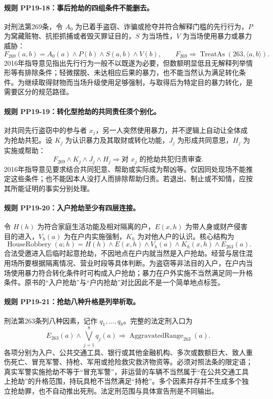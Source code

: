 \paragraph{规则 PP19-18：事后抢劫的四组条件不能删去。}
\mbox{}\par
对刑法第269条，令 $A_0$ 为已着手盗窃、诈骗或抢夺并符合解释门槛的先行行为，$P$ 为窝藏赃物、抗拒抓捕或者毁灭罪证目的，$S$ 为当场性，$V$ 为当场使用暴力或暴力威胁：
\[
F_{269}(a,b)=A_0(a)\land P(b)\land S(a,b)\land V(b),
\qquad F_{269}\Rightarrow\operatorname{TreatAs}(263,\langle a,b\rangle).
\]
2016年指导意见指出先行行为一般不以既遂为必要，但数额明显低且无解释列举情形等有排除条件；轻微摆脱、未达相应后果的暴力，也不能当然认为满足转化条件。为继续取得财物而当场升级使用足够强制，与取得后为特定目的暴力转化，是需要区分的规范路径。

\paragraph{规则 PP19-19：转化型抢劫的共同责任须个别化。}
\mbox{}\par
对共同先行盗窃中的参与者 $x_j$，另一人突然使用暴力，并不逻辑上自动让全体成为抢劫共犯。设 $K_j$ 为认识暴力及其取财或转化功能，$J_j$ 为形成共同意思，$H_j$ 为实施或帮助：
\[
F_{269}\land K_j\land J_j\land H_j
\Rightarrow\text{对 }x_j\text{ 的抢劫共犯归责审查}.
\]
2016年指导意见要求结合共同犯意、帮助或实际成为帮凶等。仅因同处现场不能推定这些条件；也不能因本人没打人而排除帮助归责。若退出、制止或不知情，应按其所能证明的事实分别处理。

\paragraph{规则 PP19-20：入户抢劫至少有四层连接。}
\mbox{}\par
令 $H(h)$ 为符合家庭生活功能及相对隔离的户，$E(x,h)$ 为带人身或财产侵害目的进入，$V_h(a)$ 为在户内实施强制，$K_h$ 为对他人户的认识。核心结构为
\[
\operatorname{HouseRobbery}(a;h)
=H(h)\land E(x,h)\land V_h(a)\land K_h(x,h)
\land E_{263}(a).
\]
合法受邀进入后临时起意抢劫，不因地点在户内就当然是入户抢劫。经营与居住混用场所要根据隔离情况、营业时段等具体判断。为盗窃等非法目的入户，在户内当场使用暴力符合转化条件时可构成入户抢劫；暴力在户外实施不当然满足同一升格条件。原书的“入户抢劫”与“户内抢劫”对比因此不是一个简单地点标签。

\paragraph{规则 PP19-21：抢劫八种升格是列举析取。}
\mbox{}\par
刑法第263条列八种因素，记作 $q_1,\ldots,q_8$。完整的法定刑入口为
\[
E_{263}(a)\land\bigvee_{j=1}^{8}q_j(a)
\Rightarrow\operatorname{AggravatedRange}_{263}(a).
\]
各项分别为入户、公共交通工具、银行或其他金融机构、多次或数额巨大、致人重伤死亡、冒充军警、持枪、军用或抢险救灾救济物资等。必须对照法条的限定语；真实军警实施抢劫不等于“冒充军警”，非运营的车辆不当然属于“在公共交通工具上抢劫”的升格范围，持玩具枪不当然满足“持枪”。多个因素并存并不生成多个独立抢劫罪，也不自动推出死刑。法定刑范围与具体宣告刑是不同输出。

